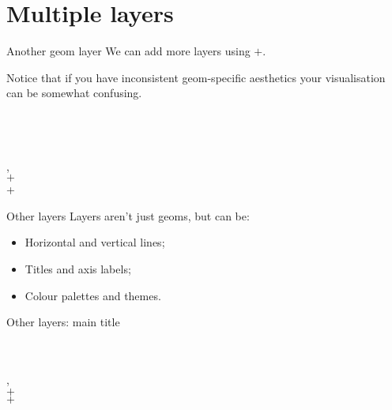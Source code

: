 \documentclass{beamer}
\begin{document}
\section{Multiple layers}
\begin{frame}{Another geom layer}
We can add more layers using $+$. 


Notice that if you have inconsistent geom-specific aesthetics your visualisation can be somewhat confusing.

\begin{example}
 \pipe  \\
 \pipe \\ 
\\
\quad {}, \\
\qquad \quad {} $+$ \\
  +
\end{example}
\end{frame}

\begin{frame}{Other layers}
Layers aren't just geoms, but can be:
\begin{itemize} 
\item Horizontal and vertical lines;
\item Titles and axis labels;
\item Colour palettes and themes.
\end{itemize}
\end{frame}

\begin{frame}{Other layers: main title}

\begin{example}
 \pipe  \\
\\
\quad {}, \\
\qquad \quad {} $+$ \\
  $+$ \\
   
\end{example}

\end{frame}
\end{document}
